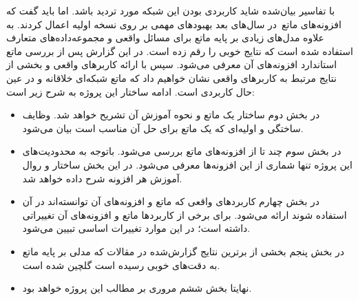 با تفاسیر بیان‌شده شاید کاربردی بودن این شبکه مورد تردید باشد. اما باید گفت که افزونه‌های ماتع\cite{gulcehre2018dynamic}\cite{merrild2018hyperntm}\ در سال‌های بعد بهبودهای مهمی بر روی نسخه اولیه اعمال کردند. به علاوه مدل‌های زیادی بر پایه ماتع برای مسائل واقعی و مجموعه‌داده‌های متعارف استفاده شده است که نتایج خوبی را رقم زده است. در این گزارش پس از بررسی ماتع استاندارد افزونه‌های آن معرفی می‌شود. سپس با ارائه کاربرهای واقعی و بخشی از نتایج مرتبط به کاربرهای واقعی نشان خواهیم داد که ماتع شبکه‌ای خلاقانه و در عین حال کاربردی است. ادامه ساختار این پروژه به شرح زیر است:
\begin{itemize}
\item در بخش دوم ساختار یک ماتع و نحوه آموزش آن تشریح خواهد شد. وظایف ساختگی و اولیه‌ای که یک ماتع برای حل آن مناسب است بیان می‌شود.
\item در بخش سوم چند تا از افزونه‌های ماتع بررسی می‌شود. باتوجه به محدودیت‌های این پروژه تنها شماری از این افزونه‌ها معرفی می‌شود. در این بخش ساختار و روال آموزش هر افزونه شرح داده خواهد شد.
\item در بخش چهارم کاربردهای واقعی که ماتع و افزونه‌های آن توانسته‌اند در آن استفاده شوند ارائه می‌شود. برای برخی از کاربردها ماتع و افزونه‌های آن تغییراتی داشته است؛ در این موارد تغییرات اساسی تبیین می‌شود.
\item در بخش پنجم بخشی از برترین نتایج گزارش‌شده در مقالات که مدلی بر پایه ماتع به دقت‌های خوبی رسیده است گلچین شده است.
\item نهایتا بخش ششم مروری بر مطالب این پروژه خواهد بود.  
\end{itemize}